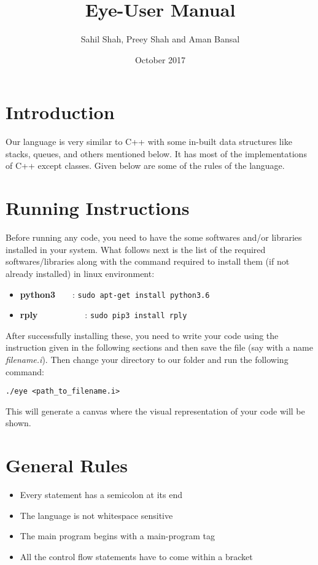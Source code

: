 \documentclass[12pt]{article}
\title{Eye-User Manual}
\author{Sahil Shah, Preey Shah and Aman Bansal }
\date{October 2017}
\begin{document}
\maketitle

\section{Introduction}
Our language is very similar to C++ with some in-built data structures like stacks, queues, and others mentioned below. It has most of the implementations of C++ except classes. Given below are some of the rules of the language.

\section{Running Instructions}
Before running any code, you need to have the some softwares and/or libraries installed in your system. What follows next is the list of the required softwares/libraries along with the command required to install them (if not already installed) in linux environment:

\begin{itemize}
\item {\bf python3}\ \ \ \  : \texttt{sudo apt-get install python3.6}
\item {\bf rply}\ \ \ \ \ \ \ \ \ \ \    : \texttt{sudo pip3 install rply}
\end{itemize}

After successfully installing these, you need to write your code using the instruction given in the following sections and then save the file (say with a name {\it filename.i}). Then change your directory to our folder and run the following command:\\
\begin{center}\texttt{./eye <path\_to\_filename.i>}\end{center}
This will generate a canvas where the visual representation of your code will be shown.



\section{General Rules}
\begin{itemize}
\item Every statement has a semicolon at its end
\item The language is not whitespace sensitive
\item The main program begins with a main-program tag
\item All the control flow statements have to come within a {} bracket
\end{itemize}
\end{document}
